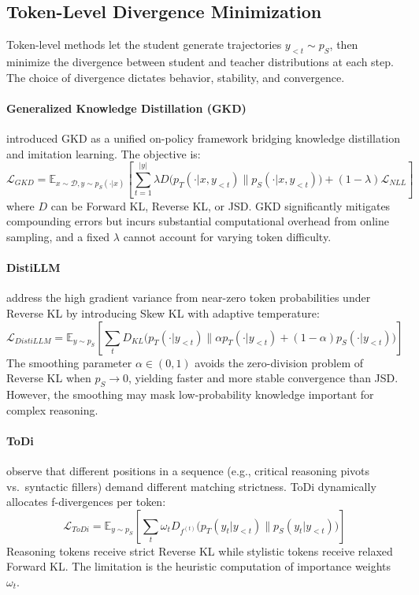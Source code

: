 \documentclass{article} %
\begin{document}
\subsection{Token-Level Divergence Minimization}
\label{subsec:token_level}

Token-level methods let the student generate trajectories $y_{<t} \sim p_S$, then minimize the divergence between student and teacher distributions at each step. The choice of divergence dictates behavior, stability, and convergence.

\paragraph{Generalized Knowledge Distillation (GKD)}
\citet{2306.13649} introduced GKD as a unified on-policy framework bridging knowledge distillation and imitation learning. The objective is:
\begin{equation}
    \mathcal{L}_{GKD} = \mathbb{E}_{x \sim \mathcal{D}, y \sim p_S(\cdot|x)} \left[ \sum_{t=1}^{|y|} \lambda D\big( p_T(\cdot|x, y_{<t}) \parallel p_S(\cdot|x, y_{<t}) \big) + (1-\lambda) \mathcal{L}_{NLL} \right]
    \label{eq:gkd}
\end{equation}
where $D$ can be Forward KL, Reverse KL, or JSD. GKD significantly mitigates compounding errors but incurs substantial computational overhead from online sampling, and a fixed $\lambda$ cannot account for varying token difficulty.

\paragraph{DistiLLM}
\citet{2402.03898} address the high gradient variance from near-zero token probabilities under Reverse KL by introducing Skew KL with adaptive temperature:
\begin{equation}
    \mathcal{L}_{DistiLLM} = \mathbb{E}_{y \sim p_S} \left[ \sum_t D_{KL}\big(p_T(\cdot|y_{<t}) \parallel \alpha p_T(\cdot|y_{<t}) + (1-\alpha) p_S(\cdot|y_{<t})\big) \right]
    \label{eq:distillm}
\end{equation}
The smoothing parameter $\alpha \in (0,1)$ avoids the zero-division problem of Reverse KL when $p_S \to 0$, yielding faster and more stable convergence than JSD. However, the smoothing may mask low-probability knowledge important for complex reasoning.

\paragraph{ToDi}
\citet{2505.16297} observe that different positions in a sequence (e.g., critical reasoning pivots vs.\ syntactic fillers) demand different matching strictness. ToDi dynamically allocates f-divergences per token:
\begin{equation}
    \mathcal{L}_{ToDi} = \mathbb{E}_{y \sim p_S} \left[ \sum_t \omega_t D_{f^{(t)}} \big( p_T(y_t|y_{<t}) \parallel p_S(y_t|y_{<t}) \big) \right]
    \label{eq:todi}
\end{equation}
Reasoning tokens receive strict Reverse KL while stylistic tokens receive relaxed Forward KL. The limitation is the heuristic computation of importance weights $\omega_t$.
\end{document}
